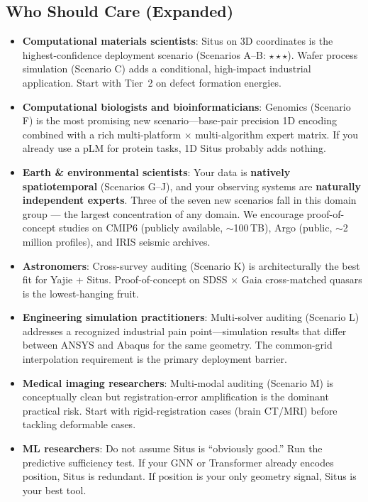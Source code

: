 \documentclass[12pt,a4paper]{article}
\begin{document}
\subsection{Who Should Care (Expanded)}

\begin{itemize}[nosep]
\item \textbf{Computational materials scientists}: Situs on 3D coordinates is the highest-confidence deployment scenario (Scenarios A--B: $\star\star\star$). Wafer process simulation (Scenario C) adds a conditional, high-impact industrial application. Start with Tier~2 on defect formation energies.
\item \textbf{Computational biologists and bioinformaticians}: Genomics (Scenario F) is the most promising new scenario—base-pair precision 1D encoding combined with a rich multi-platform $\times$ multi-algorithm expert matrix. If you already use a pLM for protein tasks, 1D Situs probably adds nothing.
\item \textbf{Earth \& environmental scientists}: Your data is \textbf{natively spatiotemporal} (Scenarios G--J), and your observing systems are \textbf{naturally independent experts}. Three of the seven new scenarios fall in this domain group — the largest concentration of any domain. We encourage proof-of-concept studies on CMIP6 (publicly available, $\sim$100\,TB), Argo (public, $\sim$2 million profiles), and IRIS seismic archives.
\item \textbf{Astronomers}: Cross-survey auditing (Scenario K) is architecturally the best fit for Yajie + Situs. Proof-of-concept on SDSS $\times$ Gaia cross-matched quasars is the lowest-hanging fruit.
\item \textbf{Engineering simulation practitioners}: Multi-solver auditing (Scenario L) addresses a recognized industrial pain point—simulation results that differ between ANSYS and Abaqus for the same geometry. The common-grid interpolation requirement is the primary deployment barrier.
\item \textbf{Medical imaging researchers}: Multi-modal auditing (Scenario M) is conceptually clean but registration-error amplification is the dominant practical risk. Start with rigid-registration cases (brain CT/MRI) before tackling deformable cases.
\item \textbf{ML researchers}: Do not assume Situs is ``obviously good.'' Run the predictive sufficiency test. If your GNN or Transformer already encodes position, Situs is redundant. If position is your only geometry signal, Situs is your best tool.
\end{itemize}
\end{document}
